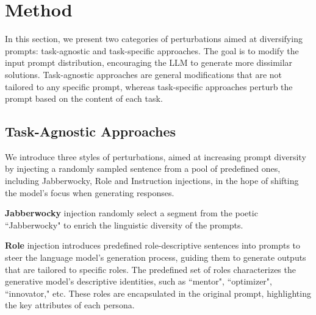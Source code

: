 \section{Method}
\label{sec:method}

In this section, we present two categories of perturbations aimed at diversifying prompts: task-agnostic and task-specific approaches. The goal is to modify the input prompt distribution, encouraging the LLM to generate more dissimilar solutions. Task-agnostic approaches are general modifications that are not tailored to any specific prompt, whereas task-specific approaches perturb the prompt based on the content of each task.



\subsection{Task-Agnostic Approaches}

We introduce three styles of perturbations, aimed at increasing prompt diversity by injecting a randomly sampled sentence from a pool of predefined ones, including Jabberwocky, Role and Instruction injections, in the hope of shifting the model's focus when generating responses. 

\textbf{Jabberwocky} injection randomly select a segment from the poetic  ``Jabberwocky" to enrich the linguistic diversity of the prompts.

\textbf{Role} injection introduces predefined role-descriptive sentences into prompts to steer the language model's generation process, guiding them to generate outputs that are tailored to specific roles. The predefined set of roles characterizes the generative model's descriptive identities, such as ``mentor", ``optimizer", ``innovator," etc. These roles are encapsulated in the original prompt, highlighting the key attributes of each persona.

